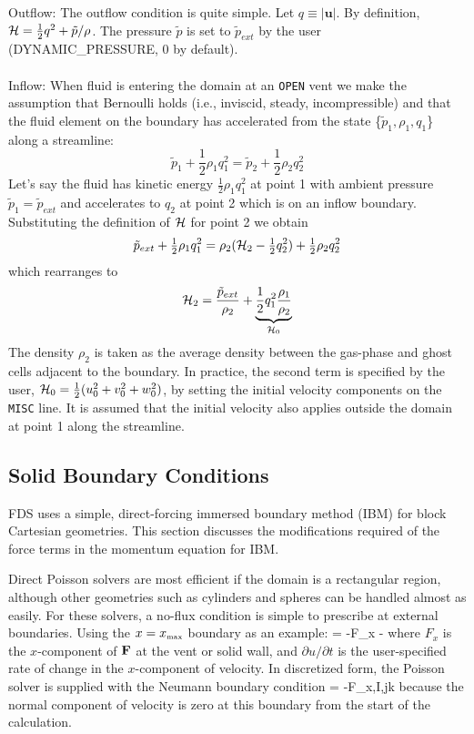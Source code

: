 Outflow: The outflow condition is quite simple.
Let $q \equiv |\mathbf{u}|$. By definition, ${\cal H} = \frac{1}{2}q^2 + \tilde{p}/\rho$.
The pressure $\tilde{p}$ is set to $\tilde{p}_{ext}$ by the user ({\ct DYNAMIC\_PRESSURE}, 0 by default).
\\
\\
Inflow: When fluid is entering the domain at an {\tt OPEN} vent we make the assumption that
Bernoulli holds (i.e., inviscid, steady, incompressible) and that the fluid element on the boundary has
accelerated from the state \{$\tilde{p}_1,\rho_1,q_1$\} along a streamline:
\begin{equation}
\tilde{p}_1 + \mbox{$\frac{1}{2}$}\rho_1 q_1^2 = \tilde{p}_2 + \mbox{$\frac{1}{2}$}\rho_2 q_2^2
\end{equation}
Let's say the fluid has kinetic energy $\frac{1}{2}\rho_1 q_1^2$ at point 1 with
ambient pressure $\tilde{p}_1 = \tilde{p}_{ext}$ and accelerates to $q_2$ at point 2 which is on an inflow boundary.
Substituting the definition of ${\cal H}$ for point 2 we obtain
\begin{equation}
\tilde{p}_{ext} + \mbox{$\frac{1}{2}$}\rho_1 q_1^2 = \rho_2({\cal H}_2 - \mbox{$\frac{1}{2}$} q_2^2) +
\mbox{$\frac{1}{2}$} \rho_2 q_2^2
\end{equation}
which rearranges to
\begin{equation}
{\cal H}_2 = \frac{\tilde{p}_{ext}}{\rho_2} + \underbrace{\frac{1}{2}q_1^2 \frac{\rho_1}{\rho_2}}_{{\cal H}_0}
\end{equation}
The density $\rho_2$ is taken as the average density between the gas-phase and ghost cells adjacent to the boundary. In practice, the second term is specified by the user, ${\cal H}_0 = \frac{1}{2}(u_0^2 + v_0^2 + w_0^2)$, by setting the initial velocity components on the {\tt MISC} line.  It is assumed that the initial velocity also applies outside the domain at point 1 along the streamline.



\subsection{Solid Boundary Conditions}

FDS uses a simple, direct-forcing immersed boundary method (IBM) \cite{Fadlun:2000} for block Cartesian geometries.  This section discusses the modifications required of the force terms in the momentum equation for IBM.

Direct Poisson solvers are most efficient if the domain is a
rectangular region, although other geometries such as cylinders
and spheres can be handled almost as easily. For these solvers,
a no-flux condition is simple to prescribe at external boundaries.
Using the $x=x_{\hbox{\tiny max}}$ boundary as an example:
\be {} = -F_x -  \label{bc} \ee
where $F_x$ is the $x$-component of ${\bf F}$ at the vent or solid wall,
and $\partial u/\partial t$ is the user-specified rate of change
in the $x$-component of velocity.
In discretized form, the Poisson solver is
supplied with the Neumann boundary condition
\be {} = -F_{x,I,jk} \label{dbc} \ee
because the normal component of velocity is zero at this boundary from the start of the calculation.

